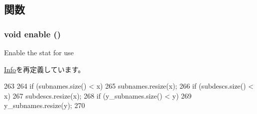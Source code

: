 \subsection{関数}
\hypertarget{classStats_1_1Vector2dInfo_a486f22824bd83c5308a0d70ffac6f758}{
\subsubsection[{enable}]{\setlength{\rightskip}{0pt plus 5cm}void enable ()}}
\label{classStats_1_1Vector2dInfo_a486f22824bd83c5308a0d70ffac6f758}
Enable the stat for use 

\hyperlink{classStats_1_1Info_a486f22824bd83c5308a0d70ffac6f758}{Info}を再定義しています。


\begin{DoxyCode}
263 {
264     if (subnames.size() < x)
265         subnames.resize(x);
266     if (subdescs.size() < x)
267         subdescs.resize(x);
268     if (y_subnames.size() < y)
269         y_subnames.resize(y);
270 }
\end{DoxyCode}



